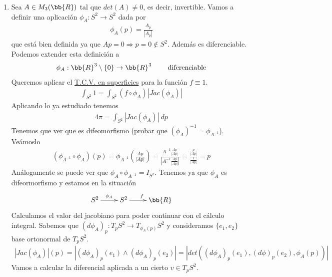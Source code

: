 \begin{ejemplo}
\begin{enumerate}
        \item Sea $A\in M_3(\bb{R})$ tal que $det(A)\neq 0$, es decir, invertible. Vamos a definir una aplicación $\phi_A : S^2 \to S^2$ dada por
        \begin{gather*}
            \phi_A(p) = \frac{A_p}{|A_p|}
        \end{gather*}
        que está bien definida ya que $Ap=0\Rightarrow p=0\notin S^2$. Además es diferenciable. Podemos extender esta definición a 
        \begin{gather*}
            \phi_A : \bb{R}^3 \setminus \{0\} \to \bb{R}^3 \qquad \text{ diferenciable}
        \end{gather*}
        Queremos aplicar el \hyperref[teo:cambio_variable_integral_sup]{T.C.V. en superficies} para la función $f\equiv 1$.
        \begin{gather*}
            \int_{S^2} 1 = \int_{S^2} (f \circ \phi_A) |Jac(\phi_A)|
        \end{gather*}
        Aplicando lo ya estudiado tenemos
        \begin{gather*}
            4\pi = \int_{S^2} |Jac(\phi_A)|\ dp
        \end{gather*}
        Tenemos que ver que es difeomorfismo (probar que $(\phi_A)^{-1} = \phi_{A^{-1}}$). Veámoslo
        \begin{gather*}
            (\phi_{A^{-1}} \circ \phi_A)(p) = 
            \phi_{A^{-1}} \left(\frac{Ap}{|Ap|}\right) = \frac{A^{-1} \frac{Ap}{|Ap|}}{\left|A^{-1} \frac{Ap}{|Ap|}\right|} = \frac{\frac{p}{|Ap|}}{\frac{1}{|Ap|}} = p
        \end{gather*}
        Análogamente se puede ver que $\phi_A \circ \phi_{A^{-1}}=I_{S^2}$. Tenemos ya que $\phi_A$ es difeormorfismo y estamos en la situación
        \begin{gather*}
            \xymatrix{
                S^2 \ar[r]^{\phi_A} & S^2 \ar[r]^f & \bb{R}
            }
        \end{gather*}
        Calculamos el valor del jacobiano para poder continuar con el cálculo integral. Sabemos que $(d\phi_A)_p : T_pS^2 \to T_{\phi_A(p)}S^2$ y consideramos $\{e_1, e_2\}$ base ortonormal de $T_pS^2$.
        \begin{gather*}
            |Jac(\phi_A)|(p) = 
            |(d\phi_A)_p(e_1) \wedge (d\phi_A)_p(e_2)| = 
            |det((d\phi_A)_p(e_1), (d\phi)_p(e_2), \phi_A(p))|
        \end{gather*}
        Vamos a calcular la diferencial aplicada a un cierto $v\in T_pS^2$.

\end{enumerate}
\end{ejemplo}
